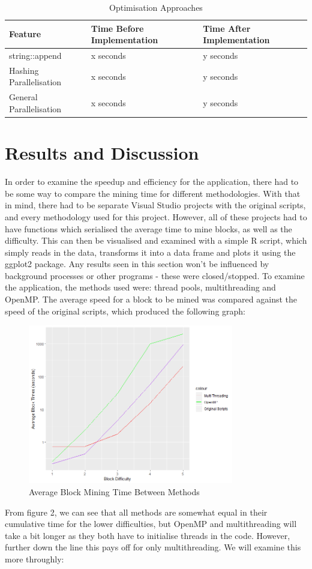 \documentclass[12pt, a4paper]{article}
\begin{document}
\begin{table}[H]
    \centering
    \begin{tabular}{| l | l | l |}
    \hline
    Feature & Time Before Implementation & Time After Implementation \\ \hline
    string::append & x seconds & y seconds \\ \hline
    Hashing Parallelisation & x seconds & y seconds \\ \hline
    General Parallelisation & x seconds & y seconds \\ \hline
    \end{tabular}
    \caption{Optimisation Approaches}
\end{table}

\section{Results and Discussion}
In order to examine the speedup and efficiency for the application, there had to be some way to compare the mining time for different methodologies. With that in mind, there had to be separate Visual Studio projects with the original scripts, and every methodology used for this project. However, all of these projects had to have functions which serialised the average time to mine blocks, as well as the difficulty. This can then be visualised and examined with a simple R script, which simply reads in the data, transforms it into a data frame and plots it using the ggplot2 package. Any results seen in this section won't be influenced by background processes or other programs - these were closed/stopped. To examine the application, the methods used were: thread pools, multithreading and OpenMP. The average speed for a block to be mined was compared against the speed of the original scripts, which produced the following graph: \\

\begin{figure}[H]
	\centering
		\includegraphics[width=0.8\textwidth]{"Times"}
		\caption{Average Block Mining Time Between Methods}
\end{figure}
From figure 2, we can see that all methods are somewhat equal in their cumulative time for the lower difficulties, but OpenMP and multithreading will take a bit longer as they both have to initialise threads in the code. However, further down the line this pays off for only multithreading. We will examine this more throughly: \\
\end{document}
